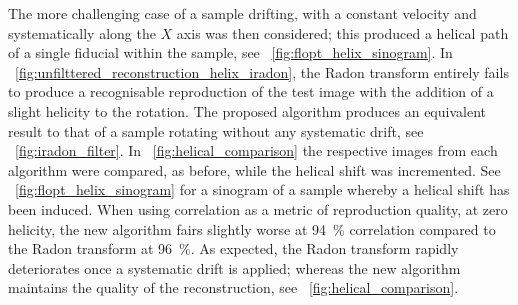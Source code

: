 \documentclass{osa-article}
\begin{document}

The more challenging case of a sample drifting, with a constant velocity and systematically along the \(X\) axis was then considered; this produced a helical path of a single fiducial within the sample, see \figurename~\ref{fig:flopt_helix_sinogram}.
In \figurename~\ref{fig:unfilttered_reconstruction_helix_iradon}, the \gls{Radon transform} entirely fails to produce a recognisable reproduction of the test image with the addition of a slight helicity to the rotation.
The proposed algorithm produces an equivalent result to that of a sample rotating without any systematic drift, see \figurename~\ref{fig:iradon_filter}.
In \figurename~\ref{fig:helical_comparison} the respective images from each algorithm were compared, as before, while the helical shift was incremented.
See \figurename~\ref{fig:flopt_helix_sinogram} for a sinogram of a sample whereby a helical shift has been induced.
When using correlation as a metric of reproduction quality, at zero helicity, the new algorithm fairs slightly worse at \SI{94}{\percent} correlation compared to the \gls{Radon transform} at \SI{96}{\percent}.
As expected, the \gls{Radon transform} rapidly deteriorates once a systematic drift is applied; whereas the new algorithm maintains the quality of the reconstruction, see \figurename~\ref{fig:helical_comparison}.
\end{document}
